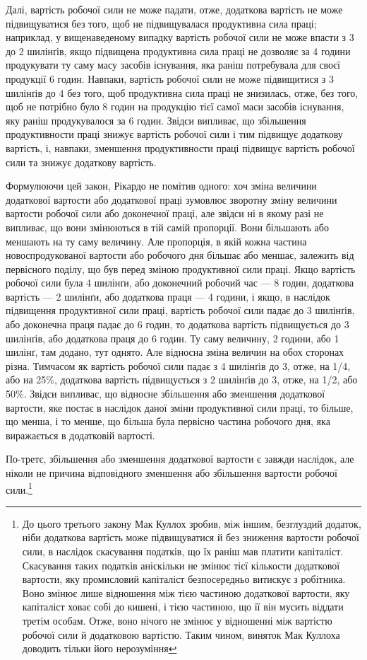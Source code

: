 Далі, вартість робочої сили не може падати, отже, додаткова
вартість не може підвищуватися без того, щоб не підвищувалася
продуктивна сила праці; наприклад, у вищенаведеному випадку
вартість робочої сили не може впасти з 3 до 2 шилінґів, якщо
підвищена продуктивна сила праці не дозволяє за 4 години продукувати
ту саму масу засобів існування, яка раніш потребувала
для своєї продукції 6 годин. Навпаки, вартість робочої сили не
може підвищитися з 3 шилінґів до 4 без того, щоб продуктивна
сила праці не знизилась, отже, без того, щоб не потрібно було
8 годин на продукцію тієї самої маси засобів існування, яку раніш
продукувалося за 6 годин. Звідси випливає, що збільшення продуктивности
праці знижує вартість робочої сили і тим підвищує
додаткову вартість, і, навпаки, зменшення продуктивности праці
підвищує вартість робочої сили та знижує додаткову вартість.

Формулюючи цей закон, Рікардо не помітив одного: хоч зміна
величини додаткової вартости або додаткової праці зумовлює
зворотну зміну величини вартости робочої сили або доконечної
праці, але звідси ні в якому разі не випливає, що вони змінюються
в тій самій пропорції. Вони більшають або меншають на ту саму
величину. Але пропорція, в якій кожна частина новоспродукованої
вартости або робочого дня більшає або меншає, залежить
від первісного поділу, що був перед зміною продуктивної сили
праці. Якщо вартість робочої сили була 4 шилінґи, або доконечний
робочий час — 8 годин, додаткова вартість — 2 шилінґи,
або додаткова праця — 4 години, і якщо, в наслідок підвищення
продуктивної сили праці, вартість робочої сили падає
до 3 шилінґів, або доконечна праця падає до 6 годин, то додаткова
вартість підвищується до 3 шилінґів, або додаткова праця
до 6 годин. Ту саму величину, 2 години, або 1 шилінґ, там додано,
тут однято. Але відносна зміна величин на обох сторонах
різна. Тимчасом як вартість робочої сили падає з 4 шилінґів
до 3, отже, на 1/4, або на 25\%, додаткова вартість підвищується
з 2 шилінґів до 3, отже, на 1/2, або 50\%. Звідси випливає, що
відносне збільшення або зменшення додаткової вартости, яке
постає в наслідок даної зміни продуктивної сили праці, то більше,
що менша, і то менше, що більша була первісно частина робочого
дня, яка виражається в додатковій вартості.

По-третє, збільшення або зменшення додаткової вартости є
завжди наслідок, але ніколи не причина відповідного зменшення
або збільшення вартости робочої сили.\footnote{
До цього третього закону Мак Куллох зробив, між іншим, безглуздий
додаток, ніби додаткова вартість може підвищуватися й без зниження
вартости робочої сили, в наслідок скасування податків, що їх раніш мав
платити капіталіст. Скасування таких податків аніскільки не змінює
тієї кількости додаткової вартости, яку промисловий капіталіст безпосередньо
витискує з робітника. Воно змінює лише відношення між тією
частиною додаткової вартости, яку капіталіст ховає собі до кишені, і
тією частиною, що її він мусить віддати третім особам. Отже, воно нічого не
змінює у відношенні між вартістю робочої сили й додатковою вартістю.
Таким чином, виняток Мак Куллоха доводить тільки його нерозуміння
}

